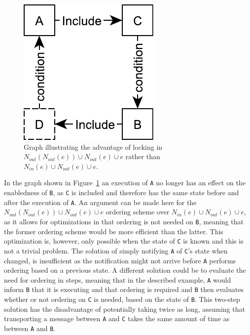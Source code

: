 \documentclass{article}
\begin{document}
	\begin{figure}[ht!]
		\center
		\includegraphics[scale=0.5]{figures/dcr-graphs/second-degree-no-effect.pdf}
		\caption{Graph illustrating the advantage of locking in $N_{out}(N_{out}(e)) \cup N_{out}(e) \cup e$ rather than $N_{in}(e) \cup N_{out}(e) \cup e$.}
		\label{fig:second-degree-no-effect}
	\end{figure}

	In the graph shown in Figure~\ref{fig:second-degree-no-effect} an execution of \texttt{A} no longer has an effect on the enabledness of \texttt{B}, as \texttt{C} is included and therefore has the same state before and after the execution of \texttt{A}.
	An argument can be made here for the $N_{out}(N_{out}(e)) \cup N_{out}(e) \cup e$ ordering scheme over $N_{in}(e) \cup N_{out}(e) \cup e$, as it allows for optimizations in that ordering is not needed on \texttt{B}, meaning that the former ordering scheme would be more efficient than the latter.
	This optimization is, however, only possible when the state of \texttt{C} is known and this is not a trivial problem.
	The solution of simply notifying \texttt{A} of \texttt{C}'s state when changed, is insufficient as the notification might not arrive before \texttt{A} performs ordering based on a previous state.
	A different solution could be to evaluate the need for ordering in steps, meaning that in the described example, \texttt{A} would inform \texttt{B} that it is executing and that ordering is required and \texttt{B} then evaluates whether or not ordering on \texttt{C} is needed, based on the state of \texttt{B}.
	This two-step solution has the disadvantage of potentially taking twice as long, assuming that transporting a message between \texttt{A} and \texttt{C} takes the same amount of time as between \texttt{A} and \texttt{B}.
\end{document}

